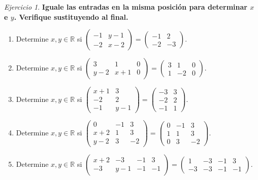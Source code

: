 \documentclass[12pt]{article}
\theoremstyle{remark}
\newtheorem{Ejer}[definicion]{Ejercicio}
\begin{document}
\begin{Ejer}
\textbf{Iguale las entradas en la misma posición para determinar $x$ e $y$. Verifique sustituyendo al final.}
\begin{enumerate}[start=47]

\item Determine $x,y\in\mathbb R$ si $\begin{pmatrix}-1&y - 1\\-2&x - 2\end{pmatrix}=\begin{pmatrix}-1&2\\-2&-3\end{pmatrix}$.

\item Determine $x,y\in\mathbb R$ si $\begin{pmatrix}3&1&0\\y - 2&x + 1&0\end{pmatrix}=\begin{pmatrix}3&1&0\\1&-2&0\end{pmatrix}$.

\item Determine $x,y\in\mathbb R$ si $\begin{pmatrix}x + 1&3\\-2&2\\-1&y - 1\end{pmatrix}=\begin{pmatrix}-3&3\\-2&2\\-1&1\end{pmatrix}$.

\item Determine $x,y\in\mathbb R$ si $\begin{pmatrix}0&-1&3\\x + 2&1&3\\y - 2&3&-2\end{pmatrix}=\begin{pmatrix}0&-1&3\\1&1&3\\0&3&-2\end{pmatrix}$.

\item Determine $x,y\in\mathbb R$ si $\begin{pmatrix}x + 2&-3&-1&3\\-3&y - 1&-1&-1\end{pmatrix}=\begin{pmatrix}1&-3&-1&3\\-3&-3&-1&-1\end{pmatrix}$.


\end{enumerate}
\end{Ejer}
\end{document}
